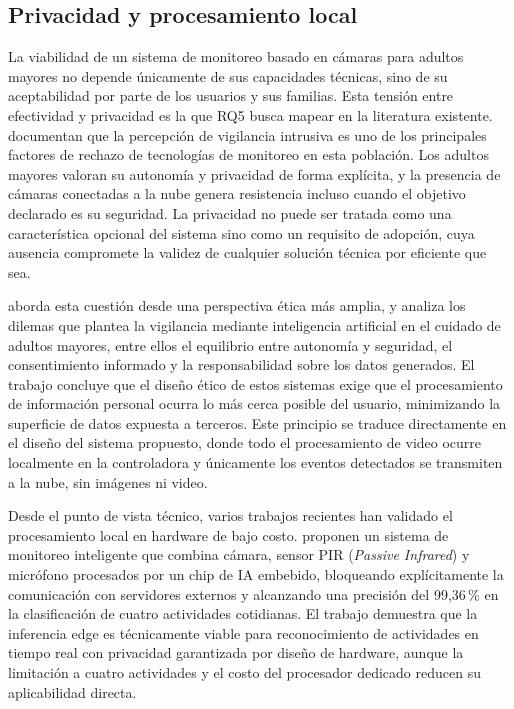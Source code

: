 \subsection{Privacidad y procesamiento local}
\label{sec:privacidad}

La viabilidad de un sistema de monitoreo basado en cámaras para adultos mayores no depende únicamente de sus capacidades técnicas, sino de su aceptabilidad por parte de los usuarios y sus familias.
Esta tensión entre efectividad y privacidad es la que RQ5 busca mapear en la literatura existente.
\textcite{PercyCampbell2024} documentan que la percepción de vigilancia intrusiva es uno de los principales factores de rechazo de tecnologías de monitoreo en esta población. Los adultos mayores valoran su autonomía y privacidad de forma explícita, y la presencia de cámaras conectadas a la nube genera resistencia incluso cuando el objetivo declarado es su seguridad. La privacidad no puede ser tratada como una característica opcional del sistema sino como un requisito de adopción, cuya ausencia compromete la validez de cualquier solución técnica por eficiente que sea.

\textcite{Joseph2025} aborda esta cuestión desde una perspectiva ética más amplia, y analiza los dilemas que plantea la vigilancia mediante inteligencia artificial en el cuidado de adultos mayores, entre ellos el equilibrio entre autonomía y seguridad, el consentimiento informado y la responsabilidad sobre los datos generados.
El trabajo concluye que el diseño ético de estos sistemas exige que el procesamiento de información personal ocurra lo más cerca posible del usuario, minimizando la superficie de datos expuesta a terceros.
Este principio se traduce directamente en el diseño del sistema propuesto, donde todo el procesamiento de video ocurre localmente en la controladora y únicamente los eventos detectados se transmiten a la nube, sin imágenes ni video.

Desde el punto de vista técnico, varios trabajos recientes han validado el procesamiento local en hardware de bajo costo.
\textcite{Kim2023} proponen un sistema de monitoreo inteligente que combina cámara, sensor PIR (\textit{Passive Infrared}) y micrófono procesados por un chip de IA embebido, bloqueando explícitamente la comunicación con servidores externos y alcanzando una precisión del 99,36\,\% en la clasificación de cuatro actividades cotidianas.
El trabajo demuestra que la inferencia edge es técnicamente viable para reconocimiento de actividades en tiempo real con privacidad garantizada por diseño de hardware, aunque la limitación a cuatro actividades y el costo del procesador dedicado reducen su aplicabilidad directa.

